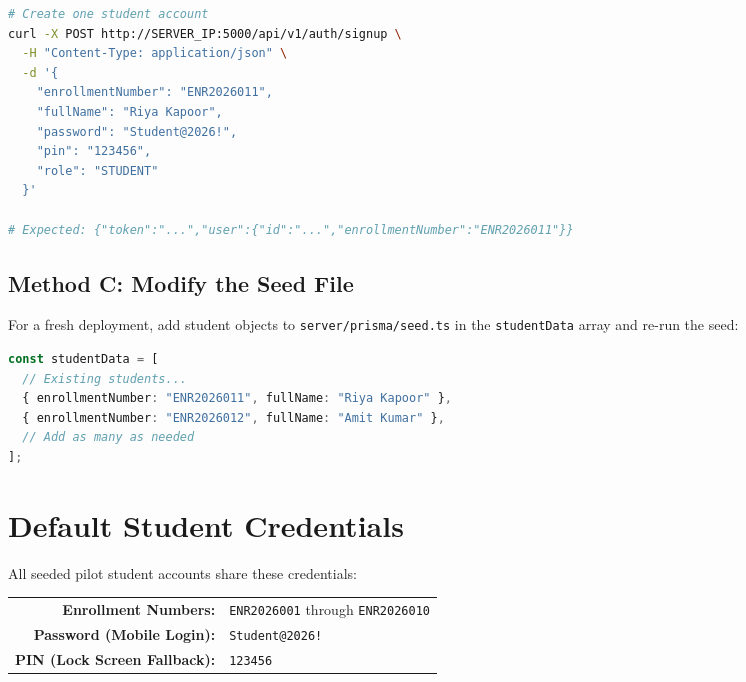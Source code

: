 \begin{tcolorbox}[codebox, title={Bulk Student Creation via API}]
\begin{lstlisting}[language=bash]
# Create one student account
curl -X POST http://SERVER_IP:5000/api/v1/auth/signup \
  -H "Content-Type: application/json" \
  -d '{
    "enrollmentNumber": "ENR2026011",
    "fullName": "Riya Kapoor",
    "password": "Student@2026!",
    "pin": "123456",
    "role": "STUDENT"
  }'

# Expected: {"token":"...","user":{"id":"...","enrollmentNumber":"ENR2026011"}}
\end{lstlisting}
\end{tcolorbox}

\subsection{Method C: Modify the Seed File}

For a fresh deployment, add student objects to \texttt{server/prisma/seed.ts} in the \texttt{studentData} array and re-run the seed:

\begin{tcolorbox}[codebox, title={Add Students to Seed Data}]
\begin{lstlisting}[language=TypeScript]
const studentData = [
  // Existing students...
  { enrollmentNumber: "ENR2026011", fullName: "Riya Kapoor" },
  { enrollmentNumber: "ENR2026012", fullName: "Amit Kumar" },
  // Add as many as needed
];
\end{lstlisting}
\end{tcolorbox}

\section{Default Student Credentials}

All seeded pilot student accounts share these credentials:

\begin{tcolorbox}[successbox, title={\faKey\quad Pilot Student Credentials}]
\begin{center}
\begin{tabular}{rl}
\textbf{Enrollment Numbers:} & \texttt{ENR2026001} through \texttt{ENR2026010}\\
\textbf{Password (Mobile Login):} & \texttt{Student@2026!}\\
\textbf{PIN (Lock Screen Fallback):} & \texttt{123456}\\
\end{tabular}
\end{center}
\end{tcolorbox}

